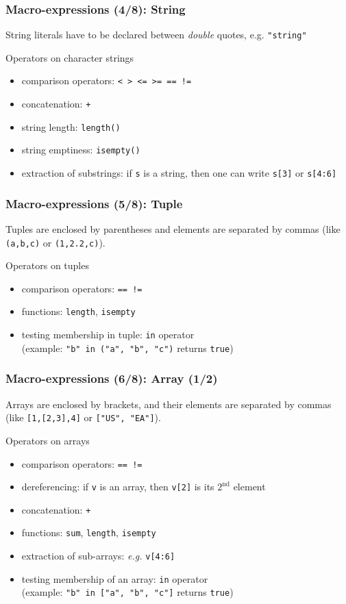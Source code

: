 \documentclass[aspectratio=169]{beamer}
\begin{document}
\begin{frame}[fragile=singleslide]
  \frametitle{Macro-expressions (4/8): String}
  String literals have to be declared between \textit{double} quotes, e.g. \texttt{"string"}
  \begin{block}{Operators on character strings}
    \begin{itemize}
    \item comparison operators: \texttt{< > <= >= == !=}
    \item concatenation: \texttt{+}
    \item string length: \texttt{length()}
    \item string emptiness: \texttt{isempty()}
    \item extraction of substrings: if \texttt{s} is a string, then one can write \texttt{s[3]} or \texttt{s[4:6]}
    \end{itemize}
  \end{block}
\end{frame}

\begin{frame}[fragile=singleslide]
  \frametitle{Macro-expressions (5/8): Tuple}
  Tuples are enclosed by parentheses and elements are separated by commas (like
  \texttt{(a,b,c)} or \texttt{(1,2.2,c)}).
  \begin{block}{Operators on tuples}
    \begin{itemize}
    \item comparison operators: \texttt{== !=}
    \item functions: \texttt{length}, \texttt{isempty}
    \item testing membership in tuple: \texttt{in} operator \\ (example:
      \texttt{"b" in ("a", "b", "c")} returns \texttt{true})
    \end{itemize}
  \end{block}
\end{frame}

\begin{frame}[fragile=singleslide]
  \frametitle{Macro-expressions (6/8): Array (1/2)}
  Arrays are enclosed by brackets, and their elements are separated by commas
  (like \texttt{[1,[2,3],4]} or \texttt{["US", "EA"]}).
  \begin{block}{Operators on arrays}
    \begin{itemize}
    \item comparison operators: \texttt{== !=}
    \item dereferencing: if \texttt{v} is an array, then \texttt{v[2]} is its $2^{\textrm{nd}}$ element
    \item concatenation: \texttt{+}
    \item functions: \texttt{sum}, \texttt{length}, \texttt{isempty}
    \item extraction of sub-arrays: \textit{e.g.} \texttt{v[4:6]}
    \item testing membership of an array: \texttt{in} operator \\ (example:
      \texttt{"b" in ["a", "b", "c"]} returns \texttt{true})
    \end{itemize}
  \end{block}
\end{frame}
\end{document}
